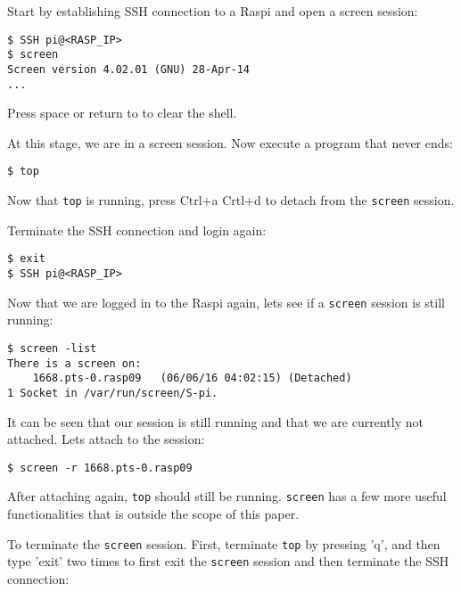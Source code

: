 Start by establishing SSH connection to a \ac{Raspi} and open a screen session:
\begin{lstlisting}[]
$ SSH pi@<RASP_IP>
$ screen
Screen version 4.02.01 (GNU) 28-Apr-14
...
\end{lstlisting}
\FloatBarrier
\vspace{-5mm}
Press space or return to to clear the shell.

At this stage, we are in a screen session. Now execute a program that never ends:
\begin{lstlisting}[]
$ top
\end{lstlisting}
\FloatBarrier
\vspace{-5mm}

Now that \texttt{top} is running, press Ctrl+a Crtl+d to detach from
the \texttt{screen} session.

Terminate the SSH connection and login again:
\begin{lstlisting}[]
$ exit
$ SSH pi@<RASP_IP>
\end{lstlisting}
\FloatBarrier
\vspace{-5mm}

Now that we are logged in to the \ac{Raspi} again, lets see if a
\texttt{screen} session is still running:
\begin{lstlisting}[]
$ screen -list
There is a screen on:
	1668.pts-0.rasp09	(06/06/16 04:02:15)	(Detached)
1 Socket in /var/run/screen/S-pi.
\end{lstlisting}
\FloatBarrier
\vspace{-5mm}

It can be seen that our session is still running and that we are
currently not attached. Lets attach to the session:
\begin{lstlisting}[]
$ screen -r 1668.pts-0.rasp09
\end{lstlisting}
\FloatBarrier
\vspace{-5mm}

After attaching again, \texttt{top} should still be running. \texttt{screen}
has a few more useful functionalities that is outside the scope of this
paper.

To terminate the \texttt{screen} session. First, terminate \texttt{top}
by pressing 'q', and then type 'exit' two times to first exit the
\texttt{screen} session and then terminate the \ac{SSH} connection:




